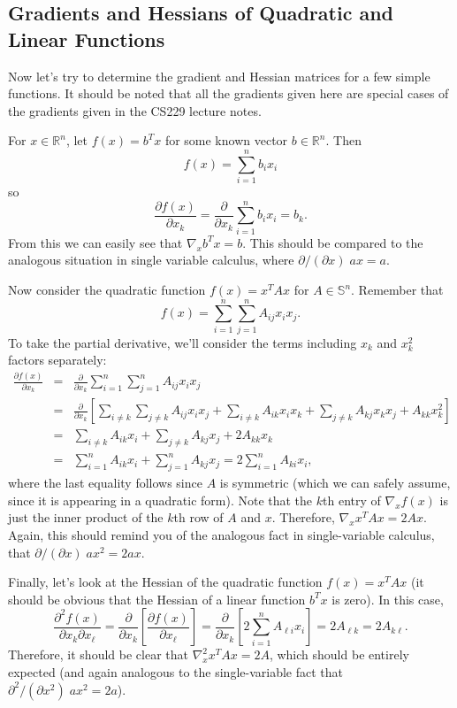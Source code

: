 \documentclass[12pt]{article}
\begin{document}
\subsection{Gradients and Hessians of Quadratic and Linear Functions}

Now let's try to determine the gradient and Hessian matrices for a few
simple functions.  It should be noted that all the gradients given
here are special cases of the gradients given in the CS229 lecture
notes.  

For $x \in \mathbb{R}^n$, let $f(x) = b^T x$ for some known
vector $b \in \mathbb{R}^n$.  Then  
\[f(x) = \sum_{i = 1}^n b_i x_i\]
so
\[\frac{\partial f(x)}{\partial x_k} = \frac{\partial}{\partial x_k}
  \sum_{i = 1}^n b_i x_i = b_k.\]
From this we can easily see that $\nabla_x b^T x = b$.  This should be
compared to the analogous situation in single variable calculus, where
$\partial/(\partial x) \; ax = a$.

Now consider the quadratic function $f(x) = x^T A x$ for $A \in
\mathbb{S}^n$.  Remember that
\[f(x) = \sum_{i=1}^n \sum_{j=1}^n A_{ij} x_i x_j. \]
To take the partial derivative, we'll consider the terms including $x_k$
and $x_k^2$ factors separately:
\begin{eqnarray*}
  \frac{\partial f(x)}{\partial x_k} 
  &=& \frac{\partial}{\partial x_k} \sum_{i=1}^n \sum_{j=1}^n A_{ij} x_i x_j \\
  &=& \frac{\partial}{\partial x_k} \left[ \sum_{i \neq k} \sum_{j \neq k} A_{ij} x_i x_j + \sum_{i \neq k} A_{ik} x_i x_k + \sum_{j \neq k} A_{kj} x_k x_j + A_{kk} x_k^2 \right] \\
  &=& \sum_{i \neq k} A_{ik} x_i + \sum_{j \neq k} A_{kj} x_j + 2 A_{kk} x_k \\
  &=& \sum_{i=1}^n A_{ik} x_i + \sum_{j=1}^n A_{kj} x_j = 2 \sum_{i=1}^n A_{ki} x_i,
\end{eqnarray*}
where the last equality follows since $A$ is symmetric (which we can
safely assume, since it is appearing in a quadratic form).
Note that the $k$th entry of $\nabla_x f(x)$ is just the inner
product of the $k$th row of $A$ and $x$.  Therefore, $\nabla_x x^T A
x = 2Ax$. Again, this should remind you of the analogous fact in
single-variable calculus, that $\partial/(\partial x)\; ax^2 = 2ax$.

Finally, let's look at the Hessian of the quadratic function $f(x) =
x^T A x$ (it should be obvious that the Hessian of a linear function
$b^T x$ is zero).  In this case,
\[\frac{\partial^2 f(x)}{\partial x_k \partial x_\ell} =
\frac{\partial}{\partial x_k} \left[ \frac{\partial f(x)}{\partial x_\ell} \right] =
\frac{\partial}{\partial x_k} \left[ 2 \sum_{i=1}^n A_{\ell i} x_i \right] = 2 A_{\ell k} = 2 A_{k \ell}.\]
Therefore, it should be clear that $\nabla_x^2 x^T A x = 2 A$, which
should be entirely expected (and again analogous to the
single-variable fact that $\partial^2/(\partial x^2)\;ax^2 = 2a$).
\end{document}
